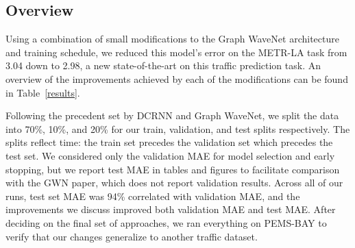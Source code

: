 \documentclass[10pt]{article}
\begin{document}
\subsection{Overview}
Using a combination of small modifications to the Graph WaveNet architecture and training schedule, we reduced this model's error on the METR-LA task from 3.04 down to 2.98, a new state-of-the-art on this traffic prediction task. An overview of the improvements achieved by each of the modifications can be found in Table~\ref{results}.

Following the precedent set by DCRNN and Graph WaveNet, we split the data into 70\%, 10\%, and 20\% for our train, validation, and test splits respectively. The splits reflect time: the train set precedes the validation set which precedes the test set. We considered only the validation MAE for model selection and early stopping, but we report test MAE in tables and figures to facilitate comparison with the GWN paper, which does not report validation results. Across all of our runs, test set MAE was 94\% correlated with validation MAE, and the improvements we discuss improved both validation MAE and test MAE. After deciding on the final set of approaches, we ran everything on PEMS-BAY to verify that our changes generalize to another traffic dataset.
\end{document}
